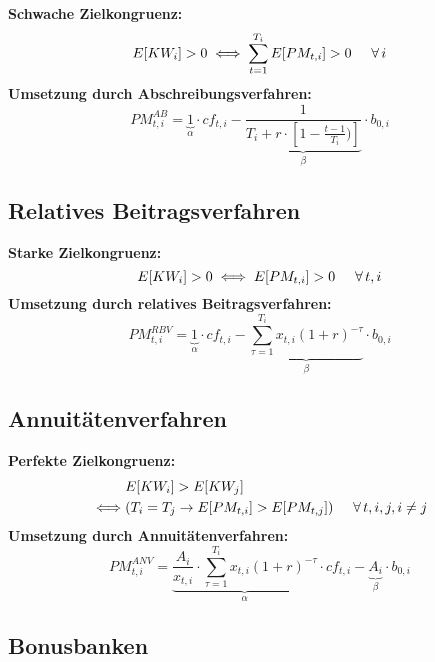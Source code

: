 \documentclass[leqno]{scrartcl}
\begin{document}
\begin{multicols}{4}
\textbf{Schwache Zielkongruenz:}
  \begin{equation*}
    E[KW_i] > 0 \iff \sum^{T_i}_{t=1} E[PM_{t,i}] > 0 \hspace{0.5cm} \forall\,i
  \end{equation*}
\textbf{Umsetzung durch Abschreibungsverfahren:}
  \begin{equation*}
    PM^{AB}_{t,i} = \underbrace{1}_{\alpha} \cdot cf_{t,i} - \underbrace{\frac{1}{T_i+r \cdot\left[1-\frac{t-1}{T_i})\right]}}_{\beta} \cdot b_{0,i}
  \end{equation*}

\subsection{Relatives Beitragsverfahren}

\textbf{Starke Zielkongruenz:}
  \begin{equation*}
    E[KW_i] > 0 \iff E[PM_{t,i}] > 0 \hspace{0.5cm} \forall\, t,i
  \end{equation*}
\textbf{Umsetzung durch relatives Beitragsverfahren:}
  \begin{equation*}
    PM^{RBV}_{t,i} = \underbrace{1}_{\alpha} \cdot cf_{t,i} - \underbrace{\sum^{T_i}_{\tau=1}x_{t,i}(1+r)^{-\tau}}_{\beta} \cdot b_{0,i}
  \end{equation*}

\subsection{Annuitätenverfahren}

\textbf{Perfekte Zielkongruenz:}
  \begin{align*}
    &E[KW_i] > E[KW_j]\\
    \iff & ( T_i = T_j \to E[PM_{t,i}] > E[PM_{t,j}]) \hspace{0.5cm} \forall\, t,i,j,i \neq j
  \end{align*}
\textbf{Umsetzung durch Annuitätenverfahren:}
  \begin{equation*}
        PM^{ANV}_{t,i} = \underbrace{\frac{A_i}{x_{t,i}} \cdot \sum^{T_i}_{\tau=1}x_{t,i}(1+r)^{-\tau}}_{\alpha} \cdot cf_{t,i} - \underbrace{A_i}_{\beta} \cdot b_{0,i}
  \end{equation*}

\subsection{Bonusbanken}


\end{multicols}
\end{document}
